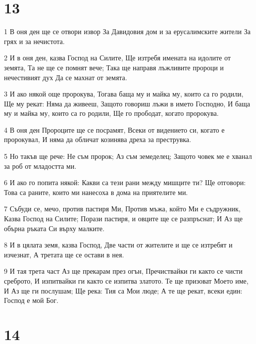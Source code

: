 \chapter{13}

\par 1 В оня ден ще се отвори извор За Давидовия дом и за ерусалимските жители За грях и за нечистота.
\par 2 И в оня ден, казва Господ на Силите, Ще изтребя имената на идолите от земята, Та не ще се помнят вече; Така ще направя лъжливите пророци и нечестивият дух Да се махнат от земята.
\par 3 И ако някой още пророкува, Тогава баща му и майка му, които са го родили, Ще му рекат: Няма да живееш, Защото говориш лъжи в името Господно, И баща му и майка му, които са го родили, Ще го прободат, когато пророкува.
\par 4 В оня ден Пророците ще се посрамят, Всеки от видението си, когато е пророкувал, И няма да обличат козинява дреха за преструвка.
\par 5 Но такъв ще рече: Не съм пророк; Аз съм земеделец; Защото човек ме е хванал за роб от младостта ми.
\par 6 И ако го попита някой: Какви са тези рани между мишците ти? Ще отговори: Това са раните, които ми нанесоха в дома на приятелите ми.
\par 7 Събуди се, мечо, против пастиря Ми, Против мъжа, който Ми е съдружник, Казва Господ на Силите; Порази пастиря, и овците ще се разпръснат; И Аз ще обърна ръката Си върху малките.
\par 8 И в цялата земя, казва Господ, Две части от жителите и ще се изтребят и изчезнат, А третата ще се остави в нея.
\par 9 И тая трета част Аз ще прекарам през огън, Пречиствайки ги както се чисти среброто, И изпитвайки ги както се изпитва златото. Те ще призоват Моето име, И Аз ще ги послушам; Ще река: Тия са Мои люде; А те ще рекат, всеки един: Господ е мой Бог.

\chapter{14}

